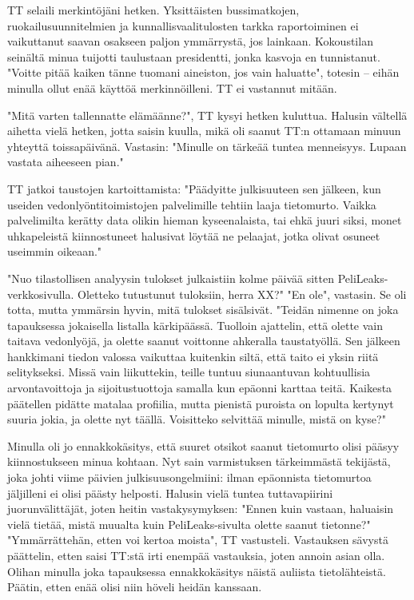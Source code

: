 ﻿\documentclass[a4paper, 12pt, finnish]{article}
\begin{document}
TT selaili merkintöjäni hetken. Yksittäisten bussimatkojen,
ruokailusuunnitelmien ja kunnallisvaalitulosten tarkka raportoiminen
ei vaikuttanut saavan osakseen paljon ymmärrystä, jos lainkaan.
Kokoustilan seinältä minua tuijotti taulustaan presidentti,
jonka kasvoja en tunnistanut. "Voitte pitää kaiken tänne
tuomani aineiston, jos vain haluatte", totesin -- eihän minulla
ollut enää käyttöä merkinnöilleni.
TT ei vastannut mitään.

"Mitä varten tallennatte elämäänne?", TT kysyi hetken kuluttua.
Halusin vältellä aihetta vielä hetken, jotta saisin kuulla,
mikä oli saanut TT:n ottamaan minuun yhteyttä
toissapäivänä. Vastasin: "Minulle on tärkeää tuntea menneisyys.
Lupaan vastata aiheeseen pian."

TT jatkoi taustojen kartoittamista: "Päädyitte julkisuuteen
sen jälkeen, kun useiden vedonlyöntitoimistojen palvelimille
tehtiin laaja tietomurto. Vaikka palvelimilta kerätty data olikin
hieman kyseenalaista, tai ehkä juuri siksi, monet uhkapeleistä
kiinnostuneet halusivat löytää ne pelaajat, jotka olivat osuneet
useimmin oikeaan."

"Nuo tilastollisen analyysin tulokset julkaistiin kolme päivää
sitten PeliLeaks-verkkosivulla. Oletteko tutustunut tuloksiin, herra XX?"
"En ole", vastasin. Se oli totta, mutta ymmärsin hyvin, mitä tulokset sisälsivät.
"Teidän nimenne on joka tapauksessa jokaisella listalla kärkipäässä.
Tuolloin ajattelin, että olette vain taitava vedonlyöjä, ja olette
saanut voittonne ahkeralla taustatyöllä. Sen jälkeen hankkimani
tiedon valossa vaikuttaa kuitenkin siltä, että taito ei yksin riitä
selitykseksi. Missä vain liikuttekin, teille tuntuu siunaantuvan kohtuullisia 
arvontavoittoja ja sijoitustuottoja samalla kun epäonni karttaa teitä.
Kaikesta päätellen pidätte matalaa profiilia, mutta pienistä
puroista on lopulta kertynyt suuria jokia, ja olette nyt täällä.
Voisitteko selvittää minulle, mistä on kyse?"

Minulla oli jo ennakkokäsitys, että suuret otsikot saanut tietomurto
olisi pääsyy kiinnostukseen minua kohtaan. Nyt sain varmistuksen
tärkeimmästä tekijästä, joka johti viime päivien
julkisuusongelmiini: ilman epäonnista tietomurtoa jäljilleni ei olisi
päästy helposti. Halusin vielä tuntea tuttavapiirini
juorunvälittäjät, joten heitin vastakysymyksen:
"Ennen kuin vastaan, haluaisin vielä tietää,
mistä muualta kuin PeliLeaks-sivulta olette saanut tietonne?"
"Ymmärrättehän, etten voi kertoa moista", TT vastusteli. 
Vastauksen sävystä päättelin, etten saisi TT:stä
irti enempää vastauksia, joten annoin asian olla.
Olihan minulla joka tapauksessa ennakkokäsitys näistä auliista
tietolähteistä. Päätin, etten enää olisi niin höveli heidän kanssaan.
\end{document}
